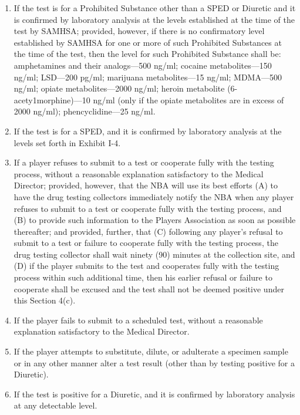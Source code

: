 \documentclass[
]{book}
\providecommand{\tightlist}{%
  \setlength{\itemsep}{0pt}\setlength{\parskip}{0pt}}
\begin{document}
\begin{enumerate}
  \begin{enumerate}
  \def\labelenumii{(\roman{enumii})}
  \tightlist
  \item
    If the test is for a Prohibited Substance other than a SPED or Diuretic and it is confirmed by laboratory analysis at the levels established at the time of the test by SAMHSA; provided, however, if there is no confirmatory level established by SAMHSA for one or more of such Prohibited Substances at the time of the test, then the level for such Prohibited Substance shall be: amphetamines and their analogs---500 ng/ml; cocaine metabolites---150 ng/ml; LSD---200 pg/ml; marijuana metabolites---15 ng/ml; MDMA---500 ng/ml; opiate metabolites---2000 ng/ml; heroin metabolite (6-acety1morphine)---10 ng/ml (only if the opiate metabolites are in excess of 2000 ng/ml); phencyclidine---25 ng/ml.
  \item
    If the test is for a SPED, and it is confirmed by laboratory analysis at the levels set forth in Exhibit I-4.
  \item
    If a player refuses to submit to a test or cooperate fully with the testing process, without a reasonable explanation satisfactory to the Medical Director; provided, however, that the NBA will use its best efforts (A) to have the drug testing collectors immediately notify the NBA when any player refuses to submit to a test or cooperate fully with the testing process, and (B) to provide such information to the Players Association as soon as possible thereafter; and provided, further, that (C) following any player's refusal to submit to a test or failure to cooperate fully with the testing process, the drug testing collector shall wait ninety (90) minutes at the collection site, and (D) if the player submits to the test and cooperates fully with the testing process within such additional time, then his earlier refusal or failure to cooperate shall be excused and the test shall not be deemed positive under this Section 4(c).
  \item
    If the player fails to submit to a scheduled test, without a reasonable explanation satisfactory to the Medical Director.
  \item
    If the player attempts to substitute, dilute, or adulterate a specimen sample or in any other manner alter a test result (other than by testing positive for a Diuretic).
  \item
    If the test is positive for a Diuretic, and it is confirmed by laboratory analysis at any detectable level.
  \end{enumerate}

\end{enumerate}
\end{document}
